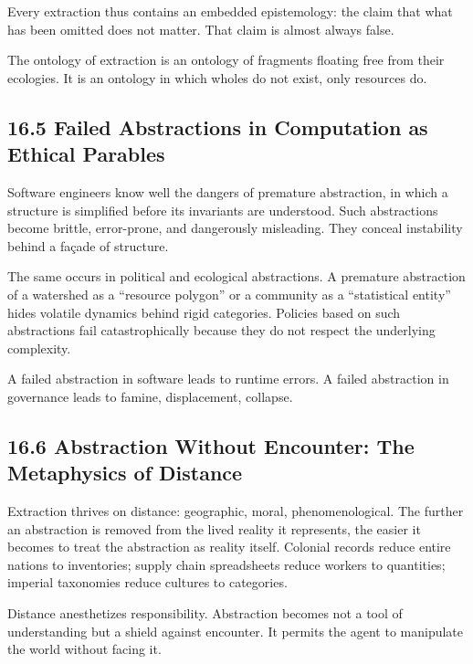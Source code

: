 \documentclass[12pt,letterpaper]{article}
\theoremstyle{remark}
\begin{document}
Every extraction thus contains an embedded epistemology: the claim that what has been omitted does not matter. That claim is almost always false.

The ontology of extraction is an ontology of fragments floating free from their ecologies. It is an ontology in which wholes do not exist, only resources do.

\subsection{16.5 Failed Abstractions in Computation as Ethical Parables}

Software engineers know well the dangers of premature abstraction, in which a structure is simplified before its invariants are understood. Such abstractions become brittle, error-prone, and dangerously misleading. They conceal instability behind a façade of structure.

The same occurs in political and ecological abstractions. A premature abstraction of a watershed as a ``resource polygon'' or a community as a ``statistical entity'' hides volatile dynamics behind rigid categories. Policies based on such abstractions fail catastrophically because they do not respect the underlying complexity.

A failed abstraction in software leads to runtime errors. A failed abstraction in governance leads to famine, displacement, collapse.

\subsection{16.6 Abstraction Without Encounter: The Metaphysics of Distance}

Extraction thrives on distance: geographic, moral, phenomenological. The further an abstraction is removed from the lived reality it represents, the easier it becomes to treat the abstraction as reality itself. Colonial records reduce entire nations to inventories; supply chain spreadsheets reduce workers to quantities; imperial taxonomies reduce cultures to categories.

Distance anesthetizes responsibility. Abstraction becomes not a tool of understanding but a shield against encounter. It permits the agent to manipulate the world without facing it.
\end{document}

